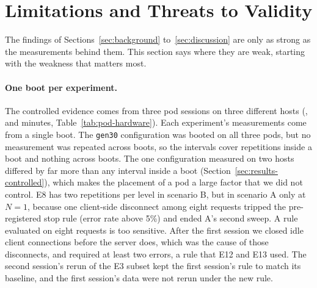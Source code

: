 \section{Limitations and Threats to Validity}\label{sec:limits}

The findings of Sections~\ref{sec:background} to~\ref{sec:discussion} are only as strong as the measurements behind
them. This section says where they are weak, starting with the weakness that matters most.

\paragraph{One boot per experiment.}
The controlled evidence comes from three pod sessions on three different hosts (,
 and  minutes, Table~\ref{tab:pod-hardware}). Each experiment's
measurements come from a single boot. The \texttt{gen30} configuration was booted on all three pods, but no
measurement was repeated across boots, so the intervals cover repetitions inside a boot and nothing across boots. The
one configuration measured on two hosts differed by far more than any interval inside a boot
(Section~\ref{sec:results-controlled}), which makes the placement of a pod a large factor that we did not control. E8
has two repetitions per level in scenario B, but in scenario A only at $N=1$, because one client-side disconnect among
eight requests tripped the pre-registered stop rule (error rate above 5\%) and ended A's second sweep. A rule evaluated
on eight requests is too sensitive. After the first session we closed idle client connections before the server does,
which was the cause of those disconnects, and required at least two errors, a rule that E12 and E13 used. The second
session's rerun of the E3 subset kept the first session's rule to match its baseline, and the first session's data
were not rerun under the new rule.

